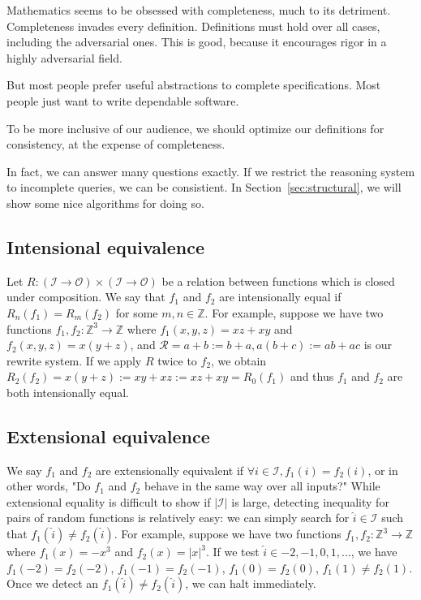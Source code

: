 \documentclass[11pt]{article}
\begin{document}
    Mathematics seems to be obsessed with completeness, much to its detriment. Completeness invades every definition. Definitions must hold over all cases, including the adversarial ones. This is good, because it encourages rigor in a highly adversarial field.

    But most people prefer useful abstractions to complete specifications. Most people just want to write dependable software.

    To be more inclusive of our audience, we should optimize our definitions for consistency, at the expense of completeness.

    In fact, we can answer many questions exactly. If we restrict the reasoning system to incomplete queries, we can be consistient. In Section~\ref{sec:structural}, we will show some nice algorithms for doing so.

    \subsection{Intensional equivalence}\label{subsec:intensional-equivalence}

    Let $R: (\mathcal{I} \rightarrow \mathcal{O}) \times (\mathcal{I}\rightarrow \mathcal{O})$ be a relation between functions which is closed under composition. We say that $f_1$ and $f_2$ are intensionally equal if $R_n(f_1)=R_m(f_2)$ for some $m,n \in \mathbb{Z}$. For example, suppose we have two functions $f_1, f_2: \mathbb{Z}^3 \rightarrow \mathbb{Z}$ where $f_1(x, y, z)=xz + xy$ and $f_2(x, y, z)=x(y + z)$, and $\mathcal{R}={a + b := b + a, a(b + c) := ab + ac}$ is our rewrite system. If we apply $R$ twice to $f_2$, we obtain $R_2(f_2)=x(y + z):=xy + xz:=xz + xy=R_0(f_1)$ and thus $f_1$ and $f_2$ are both intensionally equal.

    \subsection{Extensional equivalence}\label{subsec:extensional-equivalence}

    We say $f_1$ and $f_2$ are extensionally equivalent if $\forall i \in \mathcal{I}, f_1(i)=f_2(i)$, or in other words, "Do $f_1$ and $f_2$ behave in the same way over all inputs?" While extensional equality is difficult to show if $|\mathcal{I}|$ is large, detecting inequality for pairs of random functions is relatively easy: we can simply search for $\hat i \in \mathcal{I}$ such that $f_1(\hat i) \neq f_2(\hat i)$. For example, suppose we have two functions $f_1, f_2: \mathbb{Z}^3 \rightarrow \mathbb{Z}$ where $f_1(x)=-x^3$ and $f_2(x)=|x|^3$. If we test $\hat i \in {-2, -1, 0, 1, \ldots}$, we have $f_1(-2)=f_2(-2)$, $f_1(-1)=f_2(-1)$, $f_1(0)=f_2(0)$, $f_1(1) \neq f_2(1)$. Once we detect an $f_1(\hat i) \neq f_2(\hat i)$, we can halt immediately.
\end{document}
